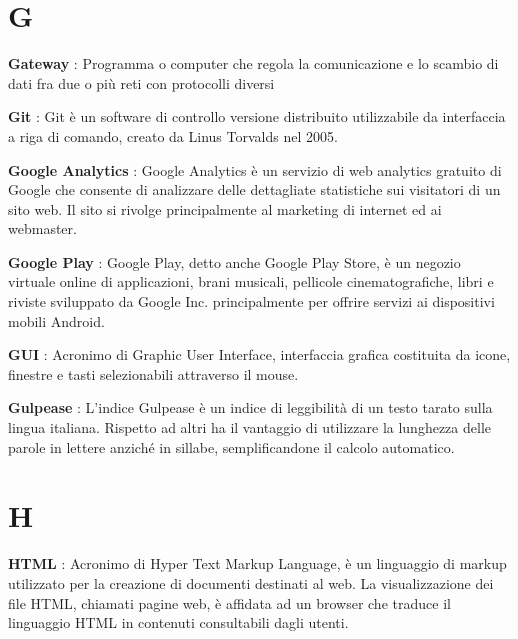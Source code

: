 \documentclass[12pt,a4paper,titlepage]{article}
\begin{document}
\section{G}
\begin{trivlist}
\item \textbf{Gateway} : Programma o computer che regola la comunicazione e lo scambio di dati fra due o più reti con protocolli diversi
\item \textbf{Git} : Git è un software di controllo versione distribuito utilizzabile da interfaccia a riga di comando, creato da Linus Torvalds nel 2005.
\item \textbf{Google Analytics} : Google Analytics è un servizio di web analytics gratuito di Google che consente di analizzare delle dettagliate statistiche sui visitatori di un sito web. Il sito si rivolge principalmente al marketing di internet ed ai webmaster.
\item \textbf{Google Play} : Google Play, detto anche Google Play Store, è un negozio virtuale online di applicazioni, brani musicali, pellicole cinematografiche, libri e riviste sviluppato da Google Inc. principalmente per offrire servizi ai dispositivi mobili Android.
\item \textbf{GUI} : Acronimo di Graphic User Interface, interfaccia grafica costituita da icone, finestre e tasti selezionabili attraverso il mouse.
\item \textbf{Gulpease} : L'indice Gulpease è un indice di leggibilità di un testo tarato sulla lingua italiana. Rispetto ad altri ha il vantaggio di utilizzare la lunghezza delle parole in lettere anziché in sillabe, semplificandone il calcolo automatico.
\end{trivlist}


\section{H}
\begin{trivlist}
	\item \textbf{HTML} : Acronimo di Hyper Text Markup Language, è un linguaggio di markup utilizzato per la creazione di documenti destinati al web. La visualizzazione dei file HTML, chiamati pagine web, è affidata ad un browser che traduce il linguaggio HTML in contenuti consultabili dagli utenti.
\end{trivlist}

\end{document}
